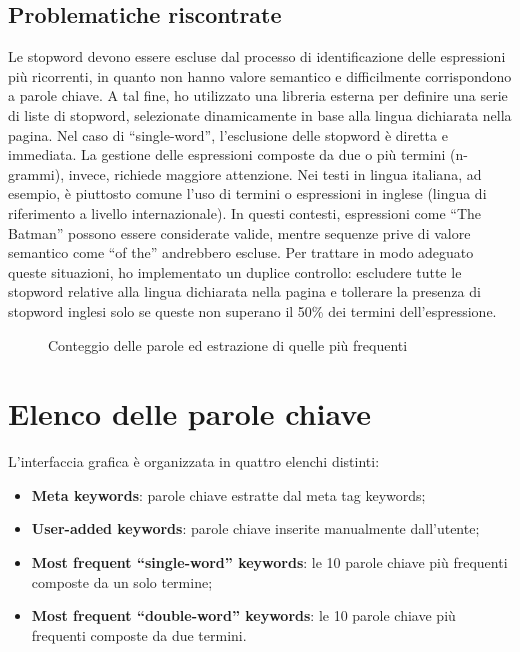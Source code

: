 \subsection{Problematiche riscontrate}

\par Le \gls{stopword} devono essere escluse dal processo di identificazione delle espressioni più ricorrenti, in quanto non hanno valore semantico e difficilmente corrispondono a parole chiave. A tal fine, ho utilizzato una libreria esterna per definire una serie di liste di \gls{stopword}, selezionate dinamicamente in base alla lingua dichiarata nella pagina. Nel caso di “single-word”, l’esclusione delle \gls{stopword} è diretta e immediata. La gestione delle espressioni composte da due o più termini (n-grammi), invece, richiede maggiore attenzione. Nei testi in lingua italiana, ad esempio, è piuttosto comune l’uso di termini o espressioni in inglese (lingua di riferimento a livello internazionale). In questi contesti, espressioni come “The Batman” possono essere considerate valide, mentre sequenze prive di valore semantico come “of the” andrebbero escluse. Per trattare in modo adeguato queste situazioni, ho implementato un duplice controllo: escludere tutte le \gls{stopword} relative alla lingua dichiarata nella pagina e tollerare la presenza di \gls{stopword} inglesi solo se queste non superano il 50\% dei termini dell’espressione.

\begin{figure}[H]
  \centering 
  \caption{Conteggio delle parole ed estrazione di quelle più frequenti}
  \label{fig:word_count}
\end{figure}

\section{Elenco delle parole chiave}
\label{sec:keyword-list}

\par L'interfaccia grafica è organizzata in quattro elenchi distinti: 
\begin{itemize}
  \item \textbf{Meta keywords}: parole chiave estratte dal meta tag keywords;
  \item \textbf{User-added keywords}: parole chiave inserite manualmente dall'utente;
  \item \textbf{Most frequent “single-word” keywords}: le 10 parole chiave più frequenti composte da un solo termine;
  \item \textbf{Most frequent “double-word” keywords}: le 10 parole chiave più frequenti composte da due termini.
\end{itemize}

